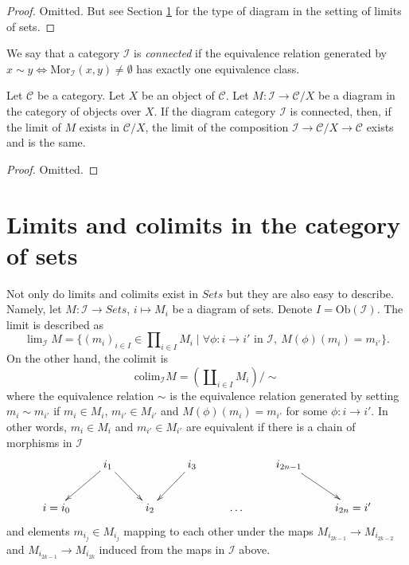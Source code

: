 \begin{proof}
Omitted. But see Section \ref{section-limit-sets}
for the type of diagram in the setting of limits of sets.
\end{proof}

\begin{definition}
\label{definition-category-connected}
We say that a category $\mathcal{I}$ is {\it connected}
if the equivalence relation generated by
$x \sim y \Leftrightarrow \text{Mor}_\mathcal{I}(x, y) \not = \emptyset$
has exactly one equivalence class.
\end{definition}

\begin{lemma}
\label{lemma-connected-limit-over-X}
Let $\mathcal{C}$ be a category.
Let $X$ be an object of $\mathcal{C}$.
Let $M : \mathcal{I} \to \mathcal{C}/X$ be a diagram
in the category of objects over $X$.
If the diagram category $\mathcal{I}$ is connected,
then, if the limit of $M$ exists in $\mathcal{C}/X$,
the limit of the composition 
$\mathcal{I} \to \mathcal{C}/X \to \mathcal{C}$
exists and is the same.
\end{lemma}

\begin{proof}
Omitted.
\end{proof}



\section{Limits and colimits in the category of sets}
\label{section-limit-sets}

\noindent
Not only do limits and colimits exist in $\textit{Sets}$
but they are also easy to describe. Namely, let $M : \mathcal{I}
\to \textit{Sets}$, $i \mapsto M_i$ be a diagram of sets.
Denote $I = \text{Ob}(\mathcal{I})$.
The limit is described as
$$
\lim\nolimits_{\mathcal{I}} M
=
\{
(m_i)_{i\in I} \in \prod\nolimits_{i\in I} M_i
\mid
\forall \phi : i \to i' \text{ in }\mathcal{I},\ 
M(\phi)(m_i) = m_{i'}
\}.
$$
On the other hand, the colimit is
$$
\text{colim}_{\mathcal{I}} M
=
(\coprod\nolimits_{i\in I} M_i)/\sim
$$
where the equivalence relation $\sim$ is the equivalence relation
generated by setting $m_i \sim m_{i'}$ if $m_i \in M_i$,
$m_{i'} \in M_{i'}$ and $M(\phi)(m_i) = m_{i'}$ for some
$\phi : i \to i'$. In other words, $m_i \in M_i$
and $m_{i'} \in M_{i'}$ are equivalent if there is a
chain of morphisms in $\mathcal{I}$
$$
\xymatrix{
&
i_1 \ar[ld] \ar[rd]
&
&
i_3 \ar[ld]
&
&
i_{2n-1} \ar[rd]
&
\\
i = i_0 
&
&
i_2
&
&
\ldots
&
&
i_{2n} = i'
}
$$
and elements $m_{i_j} \in M_{i_j}$ mapping to each other under
the maps $M_{i_{2k-1}} \to M_{i_{2k-2}}$ and $M_{i_{2k-1}}
\to M_{i_{2k}}$ induced from the maps in $\mathcal{I}$ above.

